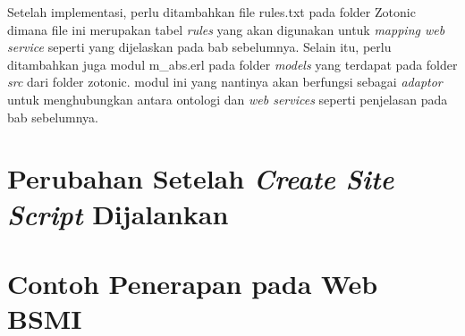 	Setelah implementasi, perlu ditambahkan file rules.txt pada folder Zotonic dimana file ini merupakan tabel \textit{rules} yang akan digunakan untuk \textit{mapping web service} seperti yang dijelaskan pada bab sebelumnya. Selain itu, perlu ditambahkan juga modul m\_abs.erl pada folder \textit{models} yang terdapat pada folder \textit{src} dari folder zotonic. modul ini yang nantinya akan berfungsi sebagai \textit{adaptor} untuk menghubungkan antara ontologi dan \textit{web services} seperti penjelasan pada bab sebelumnya.
		
\section{Perubahan Setelah \textit{Create Site Script} Dijalankan}

\section{Contoh Penerapan pada Web BSMI}
